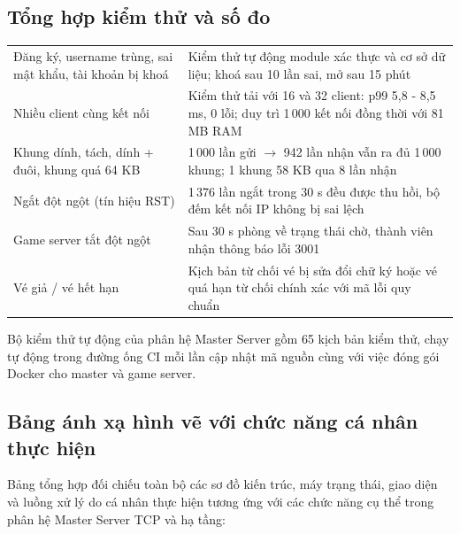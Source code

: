 \subsection{Tổng hợp kiểm thử và số đo}
\begin{center}\small
\begin{tabularx}{\linewidth}{|L{5.2cm}|Y|}
\hline
{} &  \\ \hline
Đăng ký, username trùng, sai mật khẩu, tài khoản bị khoá & Kiểm thử tự động module xác thực và cơ sở dữ liệu; khoá sau 10 lần sai, mở sau 15 phút \\ \hline
Nhiều client cùng kết nối & Kiểm thử tải với 16 và 32 client: p99 5,8 - 8,5 ms, 0 lỗi; duy trì 1\,000 kết nối đồng thời với 81 MB RAM \\ \hline
Khung dính, tách, dính + đuôi, khung quá 64 KB & 1\,000 lần gửi $\rightarrow$ 942 lần nhận vẫn ra đủ 1\,000 khung; 1 khung 58 KB qua 8 lần nhận \\ \hline
Ngắt đột ngột (tín hiệu RST) & 1\,376 lần ngắt trong 30 s đều được thu hồi, bộ đếm kết nối IP không bị sai lệch \\ \hline
Game server tắt đột ngột & Sau 30 s phòng về trạng thái chờ, thành viên nhận thông báo lỗi 3001 \\ \hline
Vé giả / vé hết hạn & Kịch bản từ chối vé bị sửa đổi chữ ký hoặc vé quá hạn từ chối chính xác với mã lỗi quy chuẩn \\ \hline
\end{tabularx}
\end{center}
Bộ kiểm thử tự động của phân hệ Master Server gồm 65 kịch bản kiểm thử, chạy tự động trong đường ống CI mỗi lần cập nhật mã nguồn cùng với việc đóng gói Docker cho master và game server.

\subsection{Bảng ánh xạ hình vẽ với chức năng cá nhân thực hiện}
\label{sec:D-mapping-hinh-ve}
Bảng tổng hợp đối chiếu toàn bộ các sơ đồ kiến trúc, máy trạng thái, giao diện và luồng xử lý do cá nhân thực hiện tương ứng với các chức năng cụ thể trong phân hệ Master Server TCP và hạ tầng:

